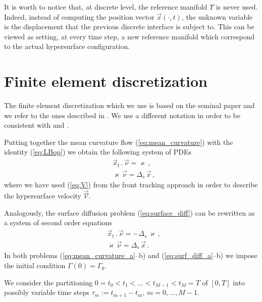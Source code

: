 It is worth to notice that, at discrete level, the reference manifold
$\Upsilon$ is never used. Indeed, instead of computing the position vector
$\vec x(\cdot,t)$, the unknown variable is the displacement that the previous
discrete interface is subject to. This can be viewed as setting, at every time
step, a new reference manifold which correspond to the actual hypersurface
configuration.

\section[Finite element discretization]{Finite element discretization}
The finite element discretization which we use is based on the seminal paper
\cite{Dziuk91} and we refer to the ones described in
\cite{triplej,triplejMC,gflows3d}. We use a different notation in order to be
consistent with \cite{spurious} and \cite{stokesfitted}.

Putting together the mean curvature flow (\ref{eq:mean_curvature}) with the
identity (\ref{eq:LBop}) we obtain the following system of PDEs
\begin{subequations}
\begin{align}
&\vec{x}_t\,.\,\vec{\nu}=\varkappa\,,\label{eq:mean_curvature_a}\\
&\varkappa\,\vec{\nu}=\Delta_s\,\vec{x}\,,\label{eq:mean_curvature_b}
\end{align}
\end{subequations}
where we have used (\ref{eq:V}) from the front tracking approach in order to
describe the hypersurface velocity $\vec{\mathcal{V}}$.

Analogously, the surface diffusion problem (\ref{eq:surface_diff}) can be
rewritten as a system of second order equations
\begin{subequations}
\begin{align}
&\vec{x}_t\,.\,\vec{\nu}=-\Delta_s\,\varkappa\,,\label{eq:surf_diff_a}\\
&\varkappa\,\vec{\nu}=\Delta_s\,\vec{x}\,.\label{eq:surf_diff_b}
\end{align}
\end{subequations}
In both problems (\ref{eq:mean_curvature_a}--b) and (\ref{eq:surf_diff_a}--b)
we impose the initial condition $\Gamma(0)=\Gamma_0$.

We consider the partitioning  $0= t_0 < t_1 < \ldots < t_{M-1} < t_M = T$ of
$[0,T]$ into possibly variable time steps
$\tau_m := t_{m+1}-t_m$, $m=0,\ldots, M-1$.

